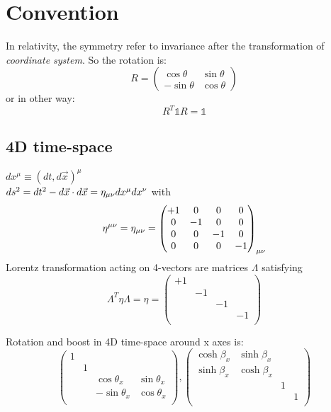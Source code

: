 \section{Convention}
In relativity, the symmetry refer to invariance after the transformation of
\emph{coordinate system}. So the rotation is:
\begin{equation}
    R = 
	\begin{pmatrix}
	    \cos\theta	& \sin\theta	\\
	    -\sin\theta	& \cos\theta
	\end{pmatrix}
\end{equation}
or in other way:
\[ R^{T}\mathds{1}R = \mathds{1} \]
    
\subsection{4D time-space}   
$dx^{\mu} \equiv (dt, d\vec{x})^{\mu}$ \\
$ ds^{2} = dt^{2} - d\vec{x}\cdot d\vec{x} =
\eta_{\mu\nu}dx^{\mu}dx^{\nu}$	with 
\begin{equation}
    \eta^{\mu\nu} = \eta_{\mu\nu} = 
    \begin{pmatrix}
	+1  & 0	  & 0  & 0	\\
	0   & -1  & 0  & 0	\\
	0   & 0	  & -1 & 0	\\
	0   & 0	  & 0  & -1
    \end{pmatrix}_{\mu\nu}
    \label{Minkowski metric}
\end{equation}
Lorentz transformation acting on 4-vectors are matrices $\Lambda$ satisfying
\[
    \Lambda^T\eta\Lambda = \eta = 
    \begin{pmatrix}
	+1  &	&   &	\\
	    & -1&   &  	\\
	    &	& -1&  	\\
	    &	&   & -1\\
    \end{pmatrix}
    \]
    
Rotation and boost in 4D time-space around x axes is:
\begin{equation*}
    \begin{pmatrix}
	1   &	&   &	\\
	    & 1 &   &	\\
	    &	& \cos\theta_x	& \sin\theta_x	\\
	    &	& -\sin\theta_x	& \cos\theta_x	\\
    \end{pmatrix},
    \begin{pmatrix}
	\cosh\beta_x	& \sinh\beta_x	&   &	\\
	\sinh\beta_x	& \cosh\beta_x	&   &	\\
	    &	& 1 &  	\\
	    &	&   & 1	\\
    \end{pmatrix}
\end{equation*}
    
